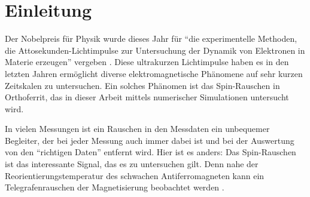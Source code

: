 \documentclass[main.tex]{subfiles}
\begin{document}
\section{Einleitung}

Der Nobelpreis für Physik wurde dieses Jahr für \enquote{die experimentelle Methoden, die Attosekunden-Lichtimpulse zur Untersuchung der Dynamik von Elektronen in Materie erzeugen} vergeben \cite{nobel-phy-2023}. Diese ultrakurzen Lichtimpulse haben es in den letzten Jahren ermöglicht diverse elektromagnetische Phänomene auf sehr kurzen Zeitskalen zu untersuchen. Ein solches Phänomen ist das Spin-Rauschen in Orthoferrit, das in dieser Arbeit mittels numerischer Simulationen untersucht wird.

In vielen Messungen ist ein Rauschen in den Messdaten ein unbequemer Begleiter, der bei jeder Messung auch immer dabei ist und bei der Auswertung von den \enquote{richtigen Daten} entfernt wird. Hier ist es anders: Das Spin-Rauschen ist das interessante Signal, das es zu untersuchen gilt. Denn nahe der Reorientierungstemperatur des schwachen Antiferromagneten kann ein Telegrafenrauschen der Magnetisierung beobachtet werden \cite{weiss-ultrafast}.

\end{document}
